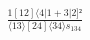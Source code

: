 \documentclass[varwidth, border=5pt]{standalone}
\begin{document}
\begin{my}
$\begin{gathered}
\scriptscriptstyle\frac{1[12]⟨4|1+3|2]²}{⟨13⟩[24]⟨34⟩s_{134}}
\end{gathered}$
\end{my}
\end{document}
